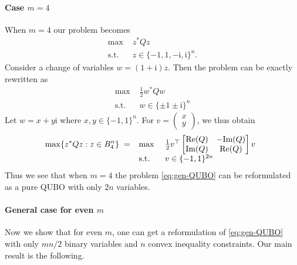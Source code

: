 \documentclass{article}
\theoremstyle{definition}
\renewcommand{\i}{\mathrm{i}}
\begin{document}
\paragraph{Case $m=4$} When $m=4$ our problem becomes
\begin{equation*}
\begin{aligned}
    \text{max }  & z^*Qz\\
    \text{s.t. } & z\in \{-1,1,-\i,\i\}^n.
\end{aligned}
\end{equation*}
Consider a change of variables $w=(1+\i) z$. Then the problem can be exactly rewritten as
\begin{equation*}
\begin{aligned}
    \text{max } & \frac{1}{2}w^*Qw\\
    \text{s.t. } & w\in \{\pm 1\pm \i\}^n
\end{aligned}
\end{equation*}
Let $w=x+y\i$ where $x,y\in\{-1,1\}^n$. For $v=\begin{pmatrix}
    x\\y
\end{pmatrix}$, we thus obtain
\begin{equation}
\max \{ z^* Q z : z \in B_4^n \} \; = \;
\begin{array}[t]{ll}
    \text{max } & \frac{1}{2}v^\top \begin{bmatrix}
        \text{Re}(Q) & -\text{Im}(Q)\\
        \text{Im}(Q) & \text{Re}(Q)
    \end{bmatrix}v\\
    \text{s.t. } & v\in \{-1,1\}^{2n}
\end{array}
\end{equation}
Thus we see that when $m=4$ the problem \eqref{eq:gen-QUBO} can be reformulated as a pure QUBO with only $2n$ variables.

\paragraph{General case for even $m$}

Now we show that for even $m$, one can get a reformulation of \eqref{eq:gen-QUBO} with only $mn/2$ binary variables and $n$ convex inequality constraints. Our main result is the following.
\end{document}
